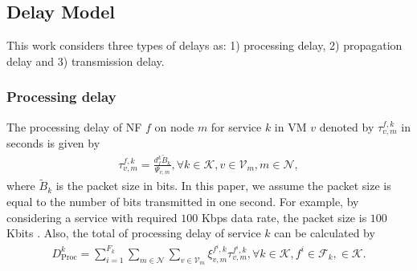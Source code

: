 \documentclass[20pt,twocolumn]{IEEEtran}
\begin{document}
\subsection{Delay Model}
This work considers three types of delays as: 1) processing delay, 2) propagation delay  and 3) transmission delay.
\subsubsection{Processing delay}
The processing delay of NF $f$ on node $m$ for service $k$ in VM $v$  denoted by $\tau_{v,m}^{f,k}$  in seconds  is given by
	\begin{align}
	\tau_{v,m}^{f,k}
	=\frac{d_{{f}}^{k}\tilde{B}_{k}}{\Psi_{v,m}},\forall k\in\mathcal{K},  v\in\mathcal{V}_m, m \in \mathcal{N},
	\end{align}
	where  $\tilde{B}_k$ is the packet size in bits. In this paper, we assume the packet size is equal to the number of bits transmitted in one second. For example, by considering a service with required $100$ Kbps data rate, the packet size is $100$ Kbits \cite{gholipoor2020e2e}. Also, the total of processing delay of service  $k$ can be calculated by 
	\begin{align}
	D_{\text{Proc}}^{k}=\sum^{F_k}_{i=1}\sum_{m\in\mathcal{N}}\sum_{v\in\mathcal{V}_{m}}\xi_{v,m}^{f^{i},k}\tau_{v,m}^{f^{i},k}, \forall k \in \mathcal{K}, f^{i}\in\mathcal{F}_k,\in\mathcal{K}.
	\end{align}
\end{document}
